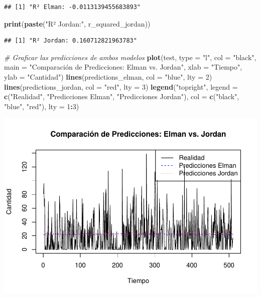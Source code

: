 \documentclass[
]{book}
\newenvironment{Shaded}{\begin{snugshade}}{\end{snugshade}}
\newcommand{\AttributeTok}[1]{\textcolor[rgb]{0.13,0.29,0.53}{#1}}
\newcommand{\CommentTok}[1]{\textcolor[rgb]{0.56,0.35,0.01}{\textit{#1}}}
\newcommand{\DecValTok}[1]{\textcolor[rgb]{0.00,0.00,0.81}{#1}}
\newcommand{\FunctionTok}[1]{\textcolor[rgb]{0.13,0.29,0.53}{\textbf{#1}}}
\newcommand{\NormalTok}[1]{#1}
\newcommand{\SpecialCharTok}[1]{\textcolor[rgb]{0.81,0.36,0.00}{\textbf{#1}}}
\newcommand{\StringTok}[1]{\textcolor[rgb]{0.31,0.60,0.02}{#1}}
\begin{document}
\begin{verbatim}
## [1] "R² Elman: -0.0113139455683893"
\end{verbatim}

\begin{Shaded}
\begin{Highlighting}[]
\FunctionTok{print}\NormalTok{(}\FunctionTok{paste}\NormalTok{(}\StringTok{"R² Jordan:"}\NormalTok{, r\_squared\_jordan))}
\end{Highlighting}
\end{Shaded}

\begin{verbatim}
## [1] "R² Jordan: 0.160712821963783"
\end{verbatim}

\begin{Shaded}
\begin{Highlighting}[]
\CommentTok{\# Graficar las predicciones de ambos modelos}
\FunctionTok{plot}\NormalTok{(test, }\AttributeTok{type =} \StringTok{"l"}\NormalTok{, }\AttributeTok{col =} \StringTok{"black"}\NormalTok{, }\AttributeTok{main =} \StringTok{"Comparación de Predicciones: Elman vs. Jordan"}\NormalTok{, }
     \AttributeTok{xlab =} \StringTok{"Tiempo"}\NormalTok{, }\AttributeTok{ylab =} \StringTok{"Cantidad"}\NormalTok{)}
\FunctionTok{lines}\NormalTok{(predictions\_elman, }\AttributeTok{col =} \StringTok{"blue"}\NormalTok{, }\AttributeTok{lty =} \DecValTok{2}\NormalTok{)}
\FunctionTok{lines}\NormalTok{(predictions\_jordan, }\AttributeTok{col =} \StringTok{"red"}\NormalTok{, }\AttributeTok{lty =} \DecValTok{3}\NormalTok{)}
\FunctionTok{legend}\NormalTok{(}\StringTok{"topright"}\NormalTok{, }\AttributeTok{legend =} \FunctionTok{c}\NormalTok{(}\StringTok{"Realidad"}\NormalTok{, }\StringTok{"Predicciones Elman"}\NormalTok{, }\StringTok{"Predicciones Jordan"}\NormalTok{), }
       \AttributeTok{col =} \FunctionTok{c}\NormalTok{(}\StringTok{"black"}\NormalTok{, }\StringTok{"blue"}\NormalTok{, }\StringTok{"red"}\NormalTok{), }\AttributeTok{lty =} \DecValTok{1}\SpecialCharTok{:}\DecValTok{3}\NormalTok{)}
\end{Highlighting}
\end{Shaded}

\includegraphics{_main_files/figure-latex/unnamed-chunk-40-4.pdf}

  
\end{document}
